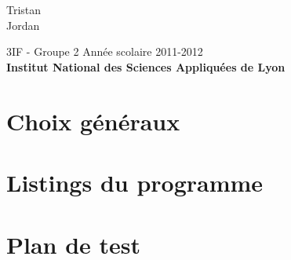 \documentclass[a4paper,french,10pt,twoside]{article}
\begin{document}
\vspace*{5cm}

\setlength\fboxrule{2pt}

\vspace{1cm}

\begin{center}
  \Large \textbf{}\\
\end{center}

\begin{center}
	\vspace*{3cm}
	\LARGE {}\\ \vspace{10pt}\large \color{black} Tristan  \\ Jordan  \\
				   \vspace*{1.5cm}

				   \vspace*{1cm}

				   \Large 3IF - Groupe 2 \hfill Ann\'ee scolaire 2011-2012\\
				   \vspace*{1cm}
				   \textbf{\Large Institut National des Sciences Appliqu\'{e}es de Lyon} \pagebreak
\end{center}

\chapter{Choix g\'en\'eraux}

\chapter{Listings du programme}












\chapter{Plan de test}
\end{document}
